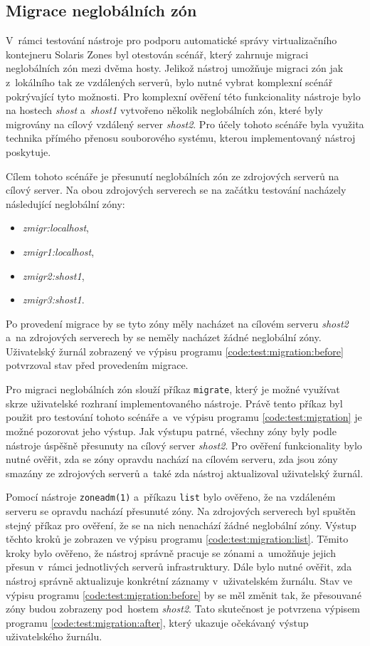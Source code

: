 \subsection{Migrace neglobálních zón}
\label{chapter:testing:scenario:migration}
V~rámci testování nástroje pro podporu automatické správy virtualizačního kontejneru Solaris Zones byl otestován scénář, který
zahrnuje migraci neglobálních zón mezi dvěma hosty. Jelikož nástroj umožňuje migraci zón jak z~lokálního tak ze vzdálených serverů,
bylo nutné vybrat komplexní scénář pokrývající tyto možnosti. Pro komplexní ověření této funkcionality nástroje bylo na hostech 
\textit{shost} a~\textit{shost1} vytvořeno několik neglobálních zón, které byly migrovány na cílový vzdálený server \textit{shost2}. 
Pro účely tohoto scénáře byla využita technika přímého přenosu souborového systému, kterou implementovaný nástroj poskytuje.

Cílem tohoto scénáře je přesunutí neglobálních zón ze zdrojových serverů na cílový server. Na obou zdrojových serverech se na
začátku testování nacházely následující neglobální zóny:
\begin{itemize}
 \item \textit{zmigr:localhost},
 \item \textit{zmigr1:localhost},
 \item \textit{zmigr2:shost1},
 \item \textit{zmigr3:shost1}.
\end{itemize}
Po provedení migrace by se tyto zóny měly nacházet na cílovém serveru \textit{shost2} a~na zdrojových serverech by se neměly
nacházet žádné neglobální zóny. Uživatelský žurnál zobrazený ve výpisu programu \ref{code:test:migration:before} potvrzoval
stav před provedením migrace.
 
Pro migraci neglobálních zón slouží příkaz \verb|migrate|, který je možné využívat skrze uživatelské rozhraní implementovaného
nástroje. Právě tento příkaz byl použit pro testování tohoto scénáře a~ve výpisu programu \ref{code:test:migration} je možné pozorovat jeho
výstup. Jak výstupu patrné, všechny zóny byly podle nástroje úspěšně přesunuty na cílový server \textit{shost2}. 
Pro ověření funkcionality bylo nutné ověřit, zda se zóny opravdu nachází na cílovém serveru, zda jsou zóny smazány
ze zdrojových serverů a~také zda nástroj aktualizoval uživatelský žurnál.

Pomocí nástroje \verb|zoneadm(1)| a~příkazu \verb|list| bylo ověřeno, že na vzdáleném serveru se opravdu nachází přesunuté zóny.
Na zdrojových serverech byl spuštěn stejný příkaz pro ověření, že se na nich nenachází žádné neglobální zóny. Výstup těchto kroků
je zobrazen ve výpisu programu \ref{code:test:migration:list}. Těmito kroky bylo ověřeno, že nástroj správně pracuje se zónami a~umožňuje
jejich přesun v~rámci jednotlivých serverů infrastruktury. Dále bylo nutné ověřit, zda nástroj správně aktualizuje konkrétní záznamy
v~uživatelském žurnálu. Stav ve výpisu programu \ref{code:test:migration:before} by se měl změnit tak, že přesouvané zóny budou
zobrazeny pod~hostem \textit{shost2}. Tato skutečnost je potvrzena výpisem programu \ref{code:test:migration:after}, který ukazuje očekávaný
výstup uživatelského žurnálu.

